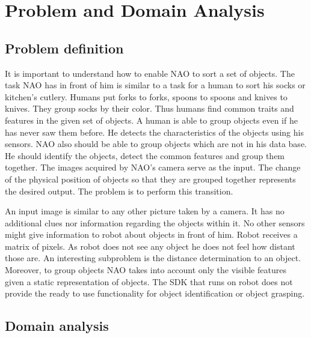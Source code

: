\section{Problem and Domain Analysis}
\subsection{Problem definition}
    It is important to understand how to enable NAO to sort a set of objects. The task NAO has in front of him is similar to a task for a human to sort his socks or kitchen's cutlery. Humans put forks to forks, spoons to spoons and knives to knives. They group socks by their color. Thus humans find common traits and features in the given set of objects. A human is able to group objects even if he has never saw them before. He detects the characteristics of the objects using his sensors. NAO also should be able to group objects which are not in his data base. He should identify the objects, detect the common features and group them together. The images acquired by NAO's camera serve as the input. The change of the physical position of objects so that they are grouped together represents the desired output. The problem is to perform this transition.
           
            An input image is similar to any other picture taken by a camera. It has no additional clues nor information regarding the objects within it. No other sensors might give information to robot about objects in front of him. Robot receives a matrix of pixels. As robot does not see any object he does not feel how distant those are. An interesting subproblem is the distance determination to an object. Moreover, to group objects NAO takes into account only the visible features given a static representation of objects. The SDK that runs on robot does not provide the ready to use functionality for object identification or object grasping.
\subsection{Domain analysis}
